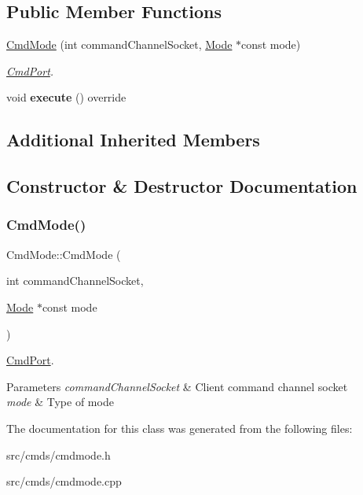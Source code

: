 \subsection*{Public Member Functions}
\begin{DoxyCompactItemize}
\item 
\hyperlink{classCmdMode_a3786de8e982eb68113e80ee6966eb9cf}{Cmd\+Mode} (int command\+Channel\+Socket, \hyperlink{classMode}{Mode} $\ast$const mode)
\begin{DoxyCompactList}\small\item\em \hyperlink{classCmdPort}{Cmd\+Port}. \end{DoxyCompactList}\item 
\mbox{\label{classCmdMode_ad00abfad98d5aa888f13e55366f6dc5e}} 
void {\bfseries execute} () override
\end{DoxyCompactItemize}
\subsection*{Additional Inherited Members}


\subsection{Constructor \& Destructor Documentation}
\mbox{\label{classCmdMode_a3786de8e982eb68113e80ee6966eb9cf}} 
\subsubsection{\texorpdfstring{Cmd\+Mode()}{CmdMode()}}
{\footnotesize\ttfamily Cmd\+Mode\+::\+Cmd\+Mode (\begin{DoxyParamCaption}\item[{int}]{command\+Channel\+Socket,  }\item[{\hyperlink{classMode}{Mode} $\ast$const}]{mode }\end{DoxyParamCaption})}



\hyperlink{classCmdPort}{Cmd\+Port}. 


\begin{DoxyParams}{Parameters}
{\em command\+Channel\+Socket} & Client command channel socket \\
\hline
{\em mode} & Type of mode \\
\hline
\end{DoxyParams}


The documentation for this class was generated from the following files\+:\begin{DoxyCompactItemize}
\item 
src/cmds/cmdmode.\+h\item 
src/cmds/cmdmode.\+cpp\end{DoxyCompactItemize}
